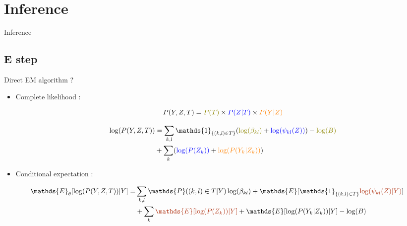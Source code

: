 \documentclass[11pt]{beamer}
\newcommand{\emphase}[1]{\textcolor{Complement}{#1}}
\newcommand{\bleu}[1]{\textcolor{Framableulight}{#1}}
\begin{document}


\section{Inference}
\begin{frame}
\begin{center}
\huge{\bleu{Inference}}
\end{center}
\end{frame}
\subsection{E step}
\begin{frame}{Direct EM algorithm ?}
\footnotesize 
\begin{itemize}
    \item \bleu{Complete likelihood :}

 \[ P(Y,Z,T) = \color{olive}P(T)\color{black}\times\color{blue}P(Z|T)\color{black}\times\color{orange}P(Y|Z)\]
 
\begin{align*}
 \log(P(Y,Z,T)) &= \sum_{k,l} \mathds{1}_{\{(k,l) \in T\}} (\color{olive}\log(\beta_{kl})\color{black} + \color{blue}\log(\psi_{kl}(Z)) \color{black})-\color{olive}\log(B)\color{black} \\
 &+\sum_k (\color{blue} \log(P(Z_k))\color{black} + \color{orange}\log(P(Y_k|Z_k))\color{black})
 \end{align*}
 
 \pause
 \item \bleu{Conditional expectation :}
\end{itemize}
\begin{align*}
    \mathds{E}_\theta[\log(P(Y,Z,T))|Y] =&\sum_{k,l} \mathds{P}((k,l) \in T|Y) \log(\beta_{kl}) + \mathds{E}[\mathds{1}_{\{(k,l) \in T\}}\emphase{\log(\psi_{kl}(Z)|Y)}]\\
& +\sum_k \emphase{\mathds{E}[\log(P(Z_k)) | Y]} + \mathds{E}[\log(P(Y_k|Z_k)) | Y]-\log(B)
\end{align*} 

\normalsize 
\end{frame}
\end{document}
